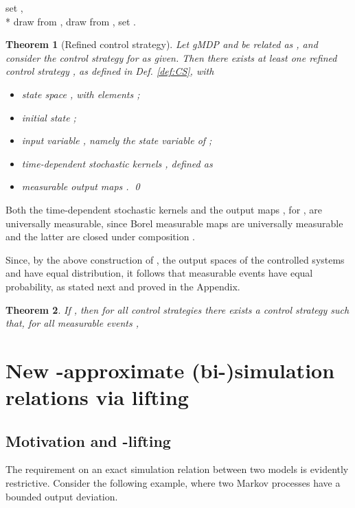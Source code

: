 \documentclass[letterpaper, 10 pt, conference]{amsart}
\newtheorem{theorem}{Theorem}
\newtheorem{thm}[theorem]{Theorem}
\theoremstyle{definition}
\theoremstyle{example}
\theoremstyle{remark}
\begin{document}
\begin{algorithm}[htp]\caption{Refinement of control strategy  as }\label{alg:refinement}\begin{algorithmic}[1]
\LOOP
{}
\STATE  set , \\*
\STATE draw  from ,
 \STATE  draw  from ,  \label{alg2:remx2}
\STATE  set . 
\ENDLOOP
\end{algorithmic} \end{algorithm}\begin{thm}[Refined control strategy]\label{thm:Cs1}
Let gMDP  and  be related as , 
and consider the control strategy  for  as given. 
Then there exists at least one refined control strategy , 
as defined in Def. \ref{def:CS}, with \begin{itemize}
\item state space , 
with elements ; 
\item initial state ;
\item input variable , namely the state variable of ;  
\item time-dependent stochastic kernels , defined as
\item measurable output maps . 
\qed  
\end{itemize}
\end{thm}
Both the time-dependent stochastic kernels  and the output maps , for , are universally measurable, 
since Borel measurable maps are universally measurable and the latter are closed under composition \cite[Ch.7]{bible}.  
 

Since, by the above construction of , 
the output spaces of the controlled systems  and  have equal distribution, 
it follows that measurable events have equal probability, as stated next and proved in the Appendix. 

\begin{theorem}\label{thm:events} 
If , then for all control strategies  there exists a control strategy  such that, 
for all measurable events ,  

\end{theorem}

\section{{New -approximate (bi-)simulation relations via lifting}}\label{sec:epsdelta}  
\subsection{Motivation and -lifting}
The requirement on an exact simulation relation between two models is evidently restrictive. 
Consider the following example, where two Markov processes have a bounded output deviation.  
\end{document}
